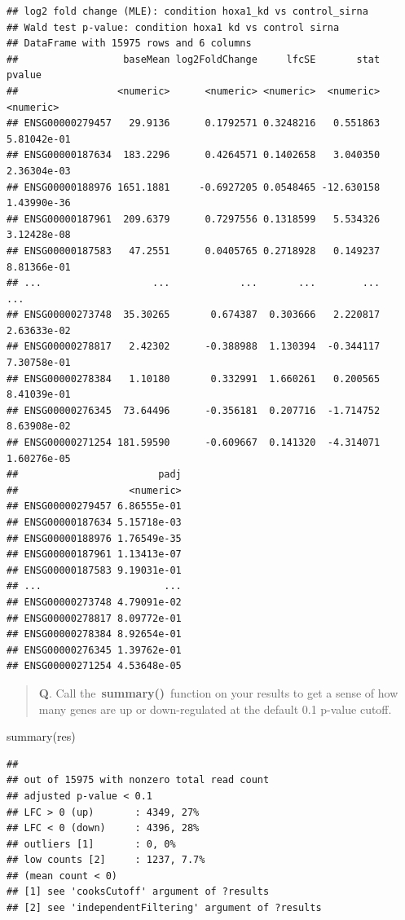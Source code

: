 \documentclass[
]{article}
\newenvironment{Shaded}{\begin{snugshade}}{\end{snugshade}}
\newcommand{\FunctionTok}[1]{\textcolor[rgb]{0.00,0.00,0.00}{#1}}
\newcommand{\NormalTok}[1]{#1}
\begin{document}
\begin{verbatim}
## log2 fold change (MLE): condition hoxa1_kd vs control_sirna 
## Wald test p-value: condition hoxa1 kd vs control sirna 
## DataFrame with 15975 rows and 6 columns
##                  baseMean log2FoldChange     lfcSE       stat      pvalue
##                 <numeric>      <numeric> <numeric>  <numeric>   <numeric>
## ENSG00000279457   29.9136      0.1792571 0.3248216   0.551863 5.81042e-01
## ENSG00000187634  183.2296      0.4264571 0.1402658   3.040350 2.36304e-03
## ENSG00000188976 1651.1881     -0.6927205 0.0548465 -12.630158 1.43990e-36
## ENSG00000187961  209.6379      0.7297556 0.1318599   5.534326 3.12428e-08
## ENSG00000187583   47.2551      0.0405765 0.2718928   0.149237 8.81366e-01
## ...                   ...            ...       ...        ...         ...
## ENSG00000273748  35.30265       0.674387  0.303666   2.220817 2.63633e-02
## ENSG00000278817   2.42302      -0.388988  1.130394  -0.344117 7.30758e-01
## ENSG00000278384   1.10180       0.332991  1.660261   0.200565 8.41039e-01
## ENSG00000276345  73.64496      -0.356181  0.207716  -1.714752 8.63908e-02
## ENSG00000271254 181.59590      -0.609667  0.141320  -4.314071 1.60276e-05
##                        padj
##                   <numeric>
## ENSG00000279457 6.86555e-01
## ENSG00000187634 5.15718e-03
## ENSG00000188976 1.76549e-35
## ENSG00000187961 1.13413e-07
## ENSG00000187583 9.19031e-01
## ...                     ...
## ENSG00000273748 4.79091e-02
## ENSG00000278817 8.09772e-01
## ENSG00000278384 8.92654e-01
## ENSG00000276345 1.39762e-01
## ENSG00000271254 4.53648e-05
\end{verbatim}

\begin{quote}
\textbf{Q}. Call the~\textbf{summary()}~function on your results to get
a sense of how many genes are up or down-regulated at the default 0.1
p-value cutoff.
\end{quote}

\begin{Shaded}
\begin{Highlighting}[]
\FunctionTok{summary}\NormalTok{(res)}
\end{Highlighting}
\end{Shaded}

\begin{verbatim}
## 
## out of 15975 with nonzero total read count
## adjusted p-value < 0.1
## LFC > 0 (up)       : 4349, 27%
## LFC < 0 (down)     : 4396, 28%
## outliers [1]       : 0, 0%
## low counts [2]     : 1237, 7.7%
## (mean count < 0)
## [1] see 'cooksCutoff' argument of ?results
## [2] see 'independentFiltering' argument of ?results
\end{verbatim}
\end{document}
